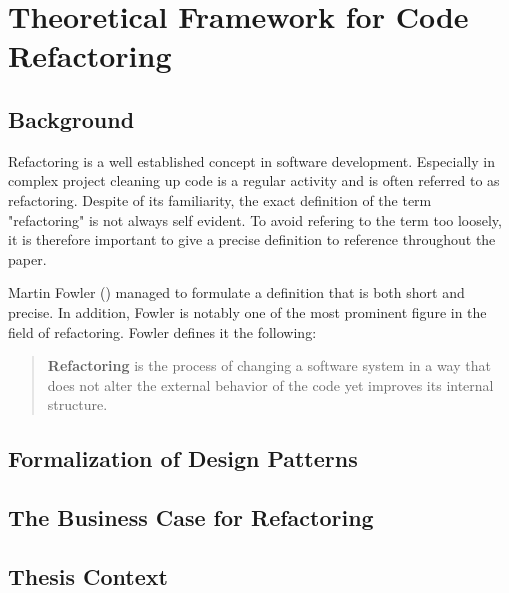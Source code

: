 \chapter{Theoretical Framework for Code Refactoring}

\section{Background}



Refactoring is a well established concept in software development. 
Especially in complex project cleaning up code is a regular activity and is often referred to as refactoring. Despite of its familiarity, the exact definition of the term "refactoring" is not always self evident.
To avoid refering to the term too loosely, it is therefore important to give a precise definition to reference throughout the paper. 

Martin Fowler (\cite{fowler2018}) managed to formulate a definition that is both short and precise. In addition, Fowler is notably one of the most prominent figure in the field of refactoring. Fowler defines it the following:

\begin{quote}
\textbf{Refactoring} is the process of changing a software system in a way that does not
alter the external behavior of the code yet improves its internal structure.\end{quote}



\section{Formalization of Design Patterns}
\section{The Business Case for Refactoring}
\section{Thesis Context}
